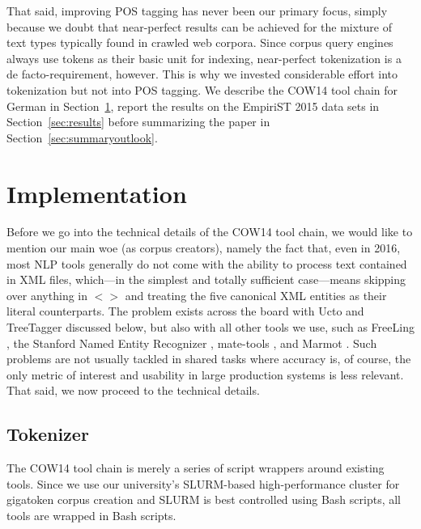 \documentclass[11pt]{article}
\begin{document}
That said, improving POS tagging has never been our primary focus, simply because we doubt that near-perfect results can be achieved for the mixture
of text types typically found in crawled web corpora.
Since corpus query engines always use tokens as their basic unit for indexing, near-perfect tokenization is a de facto-requirement, however.
This is why we invested considerable effort into tokenization but not into POS tagging.
We describe the COW14 tool chain for German in Section~\ref{sec:implementation}, report the results on the EmpiriST 2015 data sets in Section~\ref{sec:results} before summarizing the paper in Section~\ref{sec:summaryoutlook}.

\section{Implementation}
\label{sec:implementation}

Before we go into the technical details of the COW14 tool chain, we would like to mention our main woe (as corpus creators), namely the fact that, even in 2016, most NLP tools generally do not come with the ability to process text contained in XML files, which---in the simplest and totally sufficient case---means skipping over anything in $<>$ and treating the five canonical XML entities as their literal counterparts.
The problem exists across the board with Ucto and TreeTagger discussed below, but also with all other tools we use, such as FreeLing \cite{PadroStanislavsky2012}, the Stanford Named Entity Recognizer \cite{FaruquiPado2010}, mate-tools \cite{BohnetNivre2012}, and Marmot \cite{MuellerEa2013}.
Such problems are not usually tackled in shared tasks where accuracy is, of course, the only metric of interest and usability in large production systems is less relevant.
That said, we now proceed to the technical details.

\subsection{Tokenizer}
\label{sec:tokenizer}

The COW14 tool chain is merely a series of script wrappers around existing tools.
Since we use our university's SLURM-based high-performance cluster for gigatoken corpus creation and SLURM is best controlled using Bash scripts, all tools are wrapped in Bash scripts.
\end{document}
